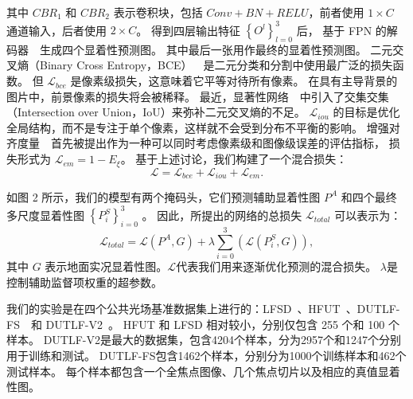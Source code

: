 %
%
其中 $CBR_{1}$ 和 $CBR_{2}$ 表示卷积块，包括 $Conv+BN+RELU$，前者使用 $1 \times C$ 通道输入，后者使用 $2 \times C$。
得到四层输出特征 $\left \{ O^{l} \right \}_{l=0}^{3} $ 后， 基于 FPN 的解码器~\cite{lin2017feature}~生成四个显着性预测图。 
其中最后一张用作最终的显着性预测图。 
%
%
%
%
%
%
%
%
%
二元交叉熵（Binary Cross Entropy，BCE）~\cite{de2005tutorial}~是二元分类和分割中使用最广泛的损失函数。 但 $\mathcal L_{bce} $ 是像素级损失，这意味着它平等对待所有像素。
在具有主导背景的图片中，前景像素的损失将会被稀释。 最近，显著性网络~\cite{qin2019basnet}~中引入了交集交集（Intersection over Union，IoU）来弥补二元交叉熵的不足。
$ \mathcal L_{iou} $ 的目标是优化全局结构，而不是专注于单个像素，这样就不会受到分布不平衡的影响。 增强对齐度量~\cite{fan2018enhanced}~首先被提出作为一种可以同时考虑像素级和图像级误差的评估指标，
损失形式为 $ \mathcal L_{em} = 1 - E_{\xi} $。 基于上述讨论，我们构建了一个混合损失：
%
%
%
\begin{equation} 
	\mathcal L = \mathcal L_{bce} + \mathcal L_{iou}  + \mathcal L_{em}  .
\end{equation}
%
%
%
%
\par
%
%
如图 2 所示，我们的模型有两个掩码头，它们预测辅助显着性图 $ P^{A} $ 和四个最终多尺度显着性图 $ \left \{ P_{i}^{S} \right \}_{i=0}^{3} $ 。 因此，所提出的网络的总损失 $ \mathcal L_{total} $ 可以表示为： 
%
\begin{equation}
	\mathcal L_{total} = \mathcal L\left ( P^{A}, G \right ) + \lambda  \sum_{i=0}^{3} \left ( \mathcal L \left (  P_{i}^{S},G \right )\right ),
\end{equation}
%
%
%
其中 $ G $ 表示地面实况显着性图。$ \mathcal L $代表我们用来逐渐优化预测的混合损失。 $ \lambda $是控制辅助监督项权重的超参数。
%
%
%
%
%
%
%
%
%
%
%
%



我们的实验是在四个公共光场基准数据集上进行的：LFSD~\cite{li2014saliency}、HFUT~\cite{zhang2017saliency}、DUTLF-FS~\cite{zhang2019memory}~和 DUTLF-V2~\cite{piao2020dut}。 HFUT 和 LFSD 相对较小，分别仅包含 255 个和 100 个样本。 DUTLF-V2是最大的数据集，包含4204个样本，分为2957个和1247个分别用于训练和测试。 DUTLF-FS包含1462个样本，分别分为1000个训练样本和462个测试样本。 每个样本都包含一个全焦点图像、几个焦点切片以及相应的真值显着性图。

